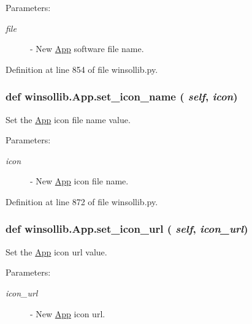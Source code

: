 \begin{Desc}
\item[Parameters:]
\begin{description}
\item[{\em file}]- New \hyperlink{classwinsollib_1_1App}{App} software file name. \end{description}
\end{Desc}


Definition at line 854 of file winsollib.py.\hypertarget{classwinsollib_1_1App_9a64e8cece58eca7dacf29f213757f1b}{
\subsubsection[set\_\-icon\_\-name]{\setlength{\rightskip}{0pt plus 5cm}def winsollib.App.set\_\-icon\_\-name ( {\em self},  {\em icon})}}
\label{classwinsollib_1_1App_9a64e8cece58eca7dacf29f213757f1b}


Set the \hyperlink{classwinsollib_1_1App}{App} icon file name value. 

\begin{Desc}
\item[Parameters:]
\begin{description}
\item[{\em icon}]- New \hyperlink{classwinsollib_1_1App}{App} icon file name. \end{description}
\end{Desc}


Definition at line 872 of file winsollib.py.\hypertarget{classwinsollib_1_1App_6e2e332bc002d98936b5e3d94a45da5a}{
\subsubsection[set\_\-icon\_\-url]{\setlength{\rightskip}{0pt plus 5cm}def winsollib.App.set\_\-icon\_\-url ( {\em self},  {\em icon\_\-url})}}
\label{classwinsollib_1_1App_6e2e332bc002d98936b5e3d94a45da5a}


Set the \hyperlink{classwinsollib_1_1App}{App} icon url value. 

\begin{Desc}
\item[Parameters:]
\begin{description}
\item[{\em icon\_\-url}]- New \hyperlink{classwinsollib_1_1App}{App} icon url. \end{description}
\end{Desc}


